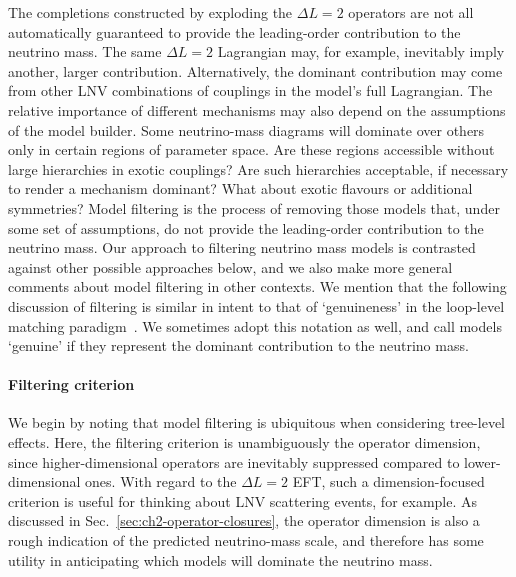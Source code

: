The completions constructed by exploding the $\Delta L = 2$ operators are not
all automatically guaranteed to provide the leading-order contribution to the
neutrino mass. The same $\Delta L = 2$ Lagrangian may, for example, inevitably
imply another, larger contribution. Alternatively, the dominant contribution may
come from other LNV combinations of couplings in the model's full Lagrangian.
The relative importance of different mechanisms may also depend on the
assumptions of the model builder. Some neutrino-mass diagrams will dominate over
others only in certain regions of parameter space. Are these regions accessible
without large hierarchies in exotic couplings? Are such hierarchies acceptable,
if necessary to render a mechanism dominant? What about exotic flavours or
additional symmetries? Model filtering is the process of removing those models
that, under some set of assumptions, do not provide the leading-order
contribution to the neutrino mass. Our approach to filtering neutrino mass
models is contrasted against other possible approaches below, and we also make
more general comments about model filtering in other contexts. We mention that
the following discussion of filtering is similar in intent to that of
`genuineness' in the loop-level matching paradigm~\cite{Bonnet:2012kz,
  Sierra:2014rxa, Cepedello:2018rfh, Farzan:2012ev}. We sometimes adopt this
notation as well, and call models `genuine' if they represent the dominant
contribution to the neutrino mass.

\paragraph{Filtering criterion} We begin by noting that model filtering is
ubiquitous when considering tree-level effects. Here, the filtering criterion is
unambiguously the operator dimension, since higher-dimensional operators are
inevitably suppressed compared to lower-dimensional ones. With regard to the
$\Delta L = 2$ EFT, such a dimension-focused criterion is useful for thinking
about LNV scattering events, for example. As discussed in
Sec.~\ref{sec:ch2-operator-closures}, the operator dimension is also a rough
indication of the predicted neutrino-mass scale, and therefore has some utility
in anticipating which models will dominate the neutrino mass.

